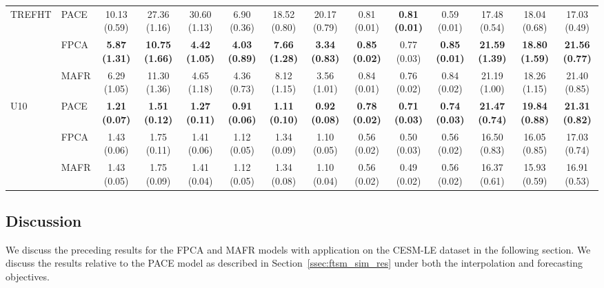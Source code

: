 \begin{landscape}
\begin{table}
{\begin{tabular}{l l c c c c c c c c c c c c}
			\midrule
			\multirow{3}{*}{TREFHT} &PACE & 10.13 (0.59) & 27.36 (1.16) & 30.60 (1.13) & 6.90 (0.36) & 18.52 (0.80) & 20.17 (0.79) & 0.81 (0.01) & \textbf{0.81 (0.01)} & 0.59 (0.01)  & 17.48 (0.54) & 18.04 (0.68) & 17.03 (0.49)  \\
			& FPCA  & \textbf{5.87 (1.31)} & \textbf{10.75 (1.66)} & \textbf{4.42 (1.05)} & \textbf{4.03 (0.89)} & \textbf{7.66 (1.28)} & \textbf{3.34 (0.83)} & \textbf{0.85 (0.02)} & 0.77 (0.03) & \textbf{0.85 (0.01)} & \textbf{21.59 (1.39)} & \textbf{18.80 (1.59)} & \textbf{21.56 (0.77)}  \\
			& MAFR  & 6.29 (1.05) & 11.30 (1.36) & 4.65 (1.18) & 4.36 (0.73) & 8.12 (1.15) & 3.56 (1.01) & 0.84 (0.01) & 0.76 (0.02) & 0.84 (0.02) & 21.19 (1.00) & 18.26 (1.15) & 21.40 (0.85) \\
			\midrule
			\multirow{3}{*}{U10} & PACE & \textbf{1.21 (0.07)} & \textbf{1.51 (0.12)} & \textbf{1.27 (0.11)} & \textbf{0.91 (0.06)} & \textbf{1.11 (0.10)} & \textbf{0.92 (0.08)} & \textbf{0.78 (0.02)} & \textbf{0.71 (0.03)} & \textbf{0.74 (0.03)} & \textbf{21.47 (0.74)} & \textbf{19.84 (0.88)} & \textbf{21.31 (0.82)}  \\
			& FPCA  & 1.43 (0.06) & 1.75 (0.11) & 1.41 (0.06) & 1.12 (0.05) & 1.34 (0.09) & 1.10 (0.05) & 0.56 (0.02) & 0.50 (0.03) & 0.56 (0.02) & 16.50 (0.83) & 16.05 (0.85) & 17.03 (0.74)  \\
			& MAFR  & 1.43 (0.05) & 1.75 (0.09) & 1.41 (0.04) & 1.12 (0.05) & 1.34 (0.08) & 1.10 (0.04) & 0.56 (0.02) & 0.49 (0.02) & 0.56 (0.02)  & 16.37 (0.61) & 15.93 (0.59) & 16.91 (0.53) \\
			\bottomrule
		\end{tabular}}
	\end{table}
\end{landscape}

\subsection{Discussion \label{ssec:ftsm_eo_disc}}
We discuss the preceding results for the FPCA and MAFR models with application on the CESM-LE dataset in the following section.
We discuss the results relative to the PACE model as described in Section~\ref{ssec:ftsm_sim_res} under both the interpolation and forecasting objectives.

